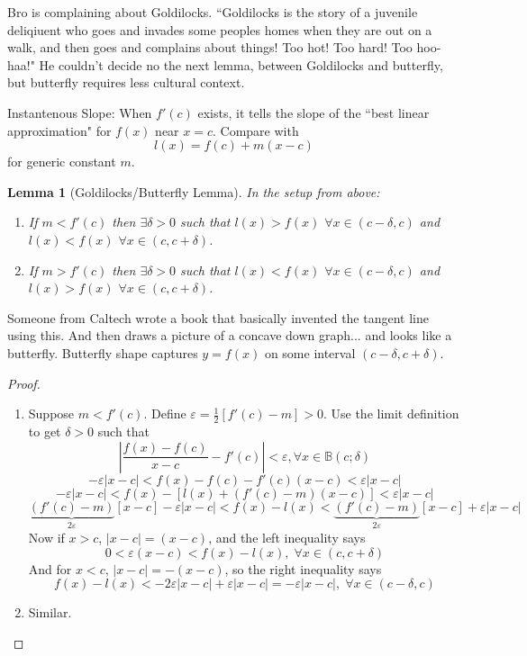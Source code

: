 \documentclass{article}
\theoremstyle{plain}
\newtheorem{lemma}{Lemma}
\theoremstyle{remark}
\newcommand{\ep}{{\varepsilon}}
\begin{document}
Bro is complaining about Goldilocks.
``Goldilocks is the story of a juvenile deliqiuent who goes and invades
some peoples homes when they are out on a walk,
and then goes and complains about things!
Too hot! Too hard! Too hoo-haa!"
He couldn't decide no the next lemma, between Goldilocks and butterfly,
but butterfly requires less cultural context.

Instantenous Slope:
When $f'(c)$ exists, it tells the slope of the ``best linear approximation"
for $f(x)$ near $x = c$.
Compare with
\[
	l(x) = f(c) + m(x-c)
\]
for generic constant $m$.

\begin{lemma}[Goldilocks/Butterfly Lemma]
	In the setup from above:
	\begin{enumerate}
		\item[(i)] If $m < f'(c)$ then $\exists \delta > 0$ such that
			$l(x) > f(x)$ $\forall x \in (c-\delta, c)$ and
			$l(x) < f(x)$ $\forall x \in (c,c+\delta)$.
		\item[(ii)] If $m > f'(c)$ then $\exists \delta > 0$ such that
			$l(x) < f(x)$ $\forall x \in (c-\delta, c)$ and
			$l(x) > f(x)$ $\forall x \in (c,c+\delta)$.
	\end{enumerate}
\end{lemma}
Someone from Caltech wrote a book that basically invented the tangent line using this.
And then draws a picture of a concave down graph...
and looks like a butterfly.
Butterfly shape captures $y = f(x)$ on some interval $(c-\delta,c+\delta)$.

\begin{proof}
	\begin{enumerate}
		\item[(i)] Suppose $m < f'(c)$.
			Define $\ep = \frac12[f'(c)-m] > 0$.
			Use the limit definition to get $\delta > 0$ such that
			\[
				\left\lvert \frac{f(x) - f(c)}{x-c} - f'(c)\right\rvert < \ep,
				\forall x \in \mathbb{B}(c;\delta)
			\]
			\[
				-\ep|x-c| < f(x) - f(c) - f'(c)(x-c) < \ep |x-c|
			\]
			\[
				-\ep|x-c| < f(x) - [l(x) + (f'(c) - m)(x-c)] < \ep|x-c|
			\]
			\[
				\underbrace{(f'(c) - m)}_{2\ep}[x-c] - \ep|x-c|
				< f(x) - l(x) < \underbrace{(f'(c) - m)}_{2\ep}[x-c] + \ep|x-c|
			\]
			Now if $x > c$, $|x-c| = (x-c)$, and the left inequality says
			\[
				0 < \ep(x-c) < f(x) - l(x), \; \forall x \in (c,c+\delta)
			\]
			And for $x < c$, $|x-c| = -(x-c)$, so the right inequality says
			\[
				f(x) - l(x) < -2\ep|x-c|+\ep|x-c| = -\ep|x-c|,
				\; \forall x \in (c-\delta,c)
			\]
		\item[(ii)] Similar.
	\end{enumerate}
\end{proof}
\end{document}

